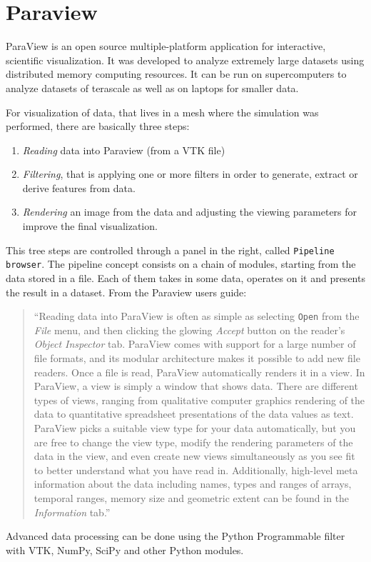 \documentclass[12pt]{article}
\begin{document}
\appendix

\section{Paraview}
\label{sec:brief-intro-paraview}

ParaView is an open source multiple-platform application for
interactive, scientific visualization. It was developed to analyze
extremely large datasets using distributed memory computing
resources. It can be run on supercomputers to analyze datasets of
terascale as well as on laptops for smaller data.

For visualization of data, that lives in a mesh where the simulation
was performed, there are basically three steps:
\begin{enumerate}
\item \textit{Reading} data into Paraview (from a VTK file)
\item \textit{Filtering}, that is applying one or more filters in order to
  generate, extract or derive features from data.
\item \textit{Rendering} an image from the data and adjusting the
  viewing parameters for improve the final visualization.
\end{enumerate}

This tree steps are controlled through a panel in the right, called
\texttt{Pipeline browser}. The pipeline concept consists on a chain of
modules, starting from the data stored in a file. Each
of them takes in some data, operates on it and presents the result in
a dataset.
From the Paraview users guide:
\begin{quote}\small
  ``Reading data into ParaView is often as simple as selecting
  \texttt{Open} from the \textit{File} menu, and then clicking the
  glowing \textit{Accept} button on the reader's \textit{Object
    Inspector} tab. ParaView comes with support for a large number of
  file formats, and its modular architecture makes it possible to add
  new file readers.  Once a file is read, ParaView automatically
  renders it in a view. In ParaView, a view is simply a window that
  shows data. There are different types of views, ranging from
  qualitative computer graphics rendering of the data to quantitative
  spreadsheet presentations of the data values as text. ParaView picks
  a suitable view type for your data automatically, but you are free
  to change the view type, modify the rendering parameters of the data
  in the view, and even create new views simultaneously as you see fit
  to better understand what you have read in. Additionally, high-level
  meta information about the data including names, types and ranges of
  arrays, temporal ranges, memory size and geometric extent can be
  found in the \textit{Information} tab.''
\end{quote}
Advanced data processing can be done using the Python Programmable
filter with VTK, NumPy, SciPy and other Python modules.
\end{document}
